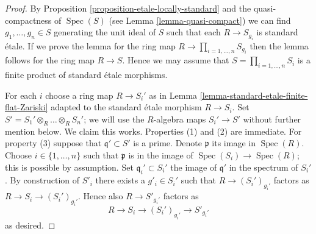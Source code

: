 \documentclass[10pt,a4paper]{amsart}
\theoremstyle{plain}
\theoremstyle{definition}
\theoremstyle{remark}
\numberwithin{equation}{subsection}
\def\Spec{\mathop{\mathrm{Spec}}}
\begin{document}
\begin{proof}
By Proposition \ref{proposition-etale-locally-standard} and
the quasi-compactness of $\Spec(S)$ (see Lemma \ref{lemma-quasi-compact})
we can find $g_1, \ldots, g_n \in S$ generating the unit ideal
of $S$ such that each $R \to S_{g_i}$ is standard \'etale.
If we prove the lemma for the ring map $R \to \prod_{i = 1, \ldots, n} S_{g_i}$
then the lemma follows for the ring map $R \to S$.
Hence we may assume that $S = \prod_{i = 1, \ldots, n} S_i$
is a finite product of standard \'etale morphisms.

\medskip\noindent
For each $i$ choose a ring map $R \to S_i'$ as in
Lemma \ref{lemma-standard-etale-finite-flat-Zariski}
adapted to the standard \'etale morphism $R \to S_i$.
Set $S' = S_1' \otimes_R \ldots \otimes_R S_n'$; we will use
the $R$-algebra maps $S_i' \to S'$ without further mention below.
We claim this works. Properties (1) and (2) are immediate.
For property (3) suppose that $\mathfrak q' \subset S'$ is a prime.
Denote $\mathfrak p$ its image in $\Spec(R)$.
Choose $i \in \{1, \ldots, n\}$ such that $\mathfrak p$
is in the image of $\Spec(S_i) \to \Spec(R)$; this is
possible by assumption. Set $\mathfrak q_i' \subset S_i'$
the image of $\mathfrak q'$ in the spectrum of $S_i'$.
By construction of $S'_i$ there exists a $g'_i \in S_i'$
such that $R \to (S_i')_{g_i'}$ factors as
$R \to S_i \to (S_i')_{g_i'}$. Hence also
$R \to S'_{g_i'}$ factors as
$$
R \to S_i \to (S_i')_{g_i'} \to S'_{g_i'}
$$
as desired.
\end{proof}
\end{document}
